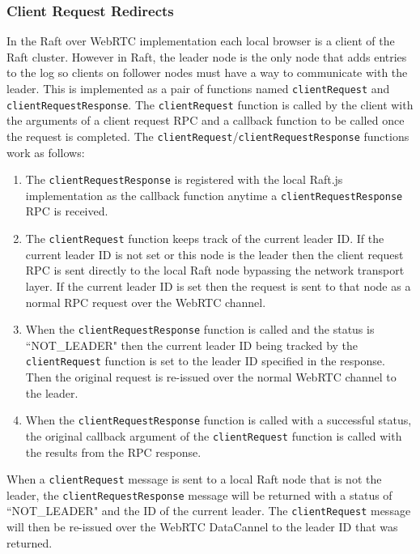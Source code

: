 \documentclass[conference,compsoc]{./IEEEtran/IEEEtran}
\begin{document}
\subsubsection{Client Request Redirects}


In the Raft over WebRTC implementation each local browser is a client
of the Raft cluster. However in Raft, the leader node is the only node
that adds entries to the log so clients on follower nodes must have
a way to communicate with the leader.
\ifdefined\OPTIONAL
This is implemented as a pair of
functions named \texttt{clientRequest} and
\texttt{clientRequestResponse}. The \texttt{clientRequest} function is
called by the client with the arguments of a client request RPC and
a callback function to be called once the request is completed. The
\texttt{clientRequest}/\texttt{clientRequestResponse} functions work
as follows:

\begin{enumerate}
\item The \texttt{clientRequestResponse} is registered with the local
    Raft.js implementation as the callback function anytime
    a \texttt{clientRequestResponse} RPC is received.
\item The \texttt{clientRequest} function keeps track of the current
    leader ID.  If the current leader ID is not set or this node is
    the leader then the client request RPC is sent directly to the
    local Raft node bypassing the network transport layer.  If the
    current leader ID is set then the request is sent to that node as
    a normal RPC request over the WebRTC channel.
\item When the \texttt{clientRequestResponse} function is called and
    the status is ``NOT\_LEADER" then the current leader ID being
    tracked by the \texttt{clientRequest} function is set to the
    leader ID specified in the response. Then the original request is
    re-issued over the normal WebRTC channel to the leader.
\item When the \texttt{clientRequestResponse} function is called with
    a successful status, the original callback argument of the
    \texttt{clientRequest} function is called with the results from
    the RPC response.
\end{enumerate}
\else
When a \texttt{clientRequest} message is sent to a local Raft node
that is not the leader, the \texttt{clientRequestResponse} message
will be returned with a status of ``NOT\_LEADER" and the ID of the
current leader. The \texttt{clientRequest} message will then be
re-issued over the WebRTC DataCannel to the leader ID that was
returned.
\fi
\end{document}
